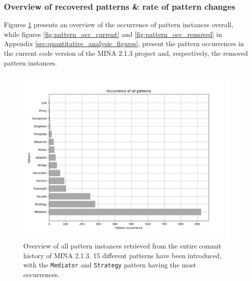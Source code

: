 \subsubsection{Overview of recovered patterns \& rate of pattern changes}
Figures \ref{fig:pattern_occ_all} presents an overview of the occurrence of pattern instances overall, while figures \ref{fig:pattern_occ_current} and \ref{fig:pattern_occ_removed} in Appendix \ref{sec:quantitative_analysis_figures}, present the pattern occurrences in the current code version of the MINA 2.1.3 project and, respectively, the removed pattern instances. 

\begin{figure}
    \centering
    \includegraphics[width =  \textwidth]{images/graphs/pattern_occurrence_all.png}
    \caption{Overview of all pattern instances retrieved from the entire commit history of MINA 2.1.3. 15 different patterns have been introduced, with the \texttt{Mediator} and \texttt{Strategy} pattern having the most occurrences.}
    \label{fig:pattern_occ_all}
\end{figure}

